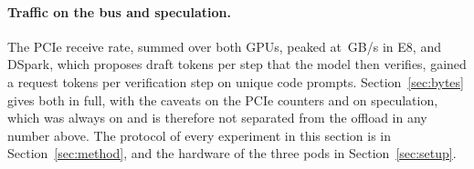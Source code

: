 

\paragraph{Traffic on the bus and speculation.}
The PCIe receive rate, summed over both GPUs, peaked at \,GB/s in E8, and DSpark, which
proposes  draft tokens per step that the model then verifies, gained a request
 tokens per verification step on unique code prompts. Section~\ref{sec:bytes} gives both
in full, with the caveats on the PCIe counters and on speculation, which was always on and is therefore not separated
from the offload in any number above. The protocol of every experiment in this section is in
Section~\ref{sec:method}, and the hardware of the three pods in Section~\ref{sec:setup}.
